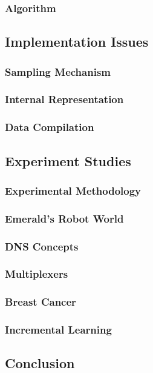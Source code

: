 \documentclass[../main.tex]{subfiles}
\begin{document}
\subsubsection{Algorithm}

\subsection{Implementation Issues}

\subsubsection{Sampling Mechanism}

\subsubsection{Internal Representation}

\subsubsection{Data Compilation}

\subsection{Experiment Studies}

\subsubsection{Experimental Methodology}

\subsubsection{Emerald's Robot World}

\subsubsection{DNS Concepts}

\subsubsection{Multiplexers}

\subsubsection{Breast Cancer}

\subsubsection{Incremental Learning}

\subsection{Conclusion}
\end{document}
